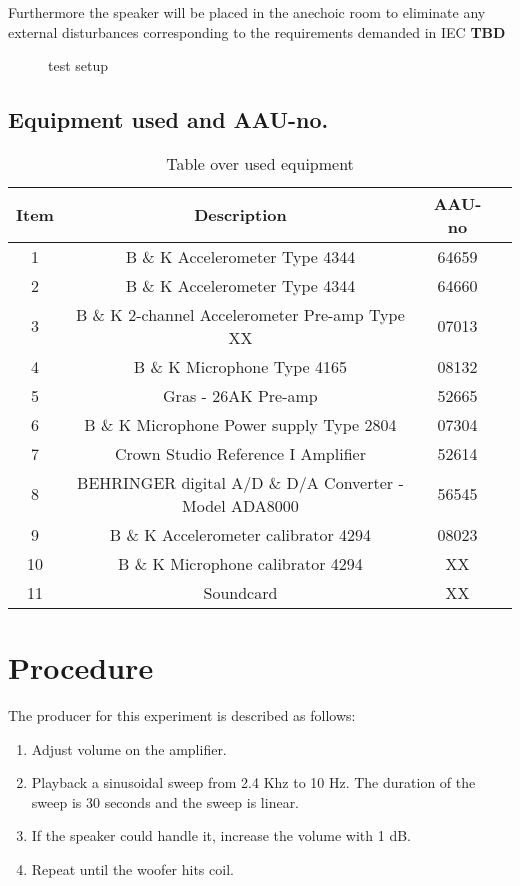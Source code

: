 Furthermore the speaker will be placed in the anechoic room to eliminate any external disturbances corresponding to the requirements demanded in IEC \textbf{TBD}

\begin{figure}[H]
\centering
{}

\caption{test setup}
\label{figure:SpeakertestSetup}
\end{figure}

\subsection*{Equipment used and AAU-no.}

\begin{table}[H]
\centering
{}
\begin{tabular}{S[table-format=1]ccc} \toprule
    {Item} & {Description} & {AAU-no} \\       &  B \& K Accelerometer Type 4344  & 64659   \\ 
    2      &  B \& K Accelerometer Type 4344  & 64660   \\ 
    3      &  B \& K 2-channel Accelerometer Pre-amp Type XX  & 07013   \\
    4      &  B \& K Microphone Type 4165  & 08132   \\
    5      &  Gras - 26AK Pre-amp & 52665   \\
    6      &  B \& K Microphone Power supply Type 2804  & 07304   \\
    7      &  Crown Studio Reference I Amplifier & 52614   \\
    8      &  BEHRINGER digital A/D \& D/A Converter - Model ADA8000   & 56545   \\
    9      &  B \& K Accelerometer calibrator 4294 & 08023   \\
    10     &  B \& K Microphone calibrator 4294 & XX   \\
    11     & Soundcard  & XX  \\ \bottomrule 
\end{tabular}
\caption{Table over used equipment}
\end{table}



\section{Procedure}\label{sec:SpeakerTestProcedure}

The producer for this experiment is described as follows:
\begin{enumerate}
\item Adjust volume on the amplifier.
\item Playback a sinusoidal sweep from 2.4 Khz to 10 Hz. The duration of the sweep is 30 seconds and the sweep is linear.
\item If the speaker could handle it, increase the volume with 1 dB.
\item Repeat until the woofer hits coil. 
\end{enumerate}


